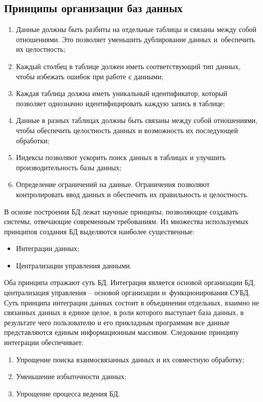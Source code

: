 \documentclass{ou}
\begin{document}
\subsection{Принципы организации баз данных}
\begin{enumerate}[leftmargin=0em, itemindent=3.75em, nosep, label=\arabic*)]
\item Данные должны быть разбиты на отдельные таблицы и связаны между собой отношениями. Это позволяет уменьшить дублирование данных и~обеспечить их целостность;
\item Каждый столбец в таблице должен иметь соответствующий тип данных, чтобы избежать ошибок при работе с данными;
\item Каждая таблица должна иметь уникальный идентификатор, который позволяет однозначно идентифицировать каждую запись в таблице\cite{Karpova2013};
\item Данные в разных таблицах должны быть связаны между собой отношениями, чтобы обеспечить целостность данных и возможность их последующей обработки;
\item Индексы позволяют ускорить поиск данных в таблицах и улучшить производительность базы данных;
\item Определение ограничений на данные. Ограничения позволяют контролировать ввод данных и обеспечить их правильность и целостность\cite{Sergeev2012}.
\end{enumerate}

В основе построения БД лежат научные принципы, позволяющие создавать системы, отвечающие современным требованиям. Из множества используемых принципов создания БД выделяются наиболее существенные:
\begin{itemize}[label=-, leftmargin=0em, itemindent=3.35em, nosep]
\item Интеграции данных;
\item Централизации управления данными.
\end{itemize}

Оба принципа отражают суть БД. Интеграция является основой организации БД, централизация управления -- основой организации и~функционирования СУБД. 
Суть принципа интеграции данных состоит в объединении отдельных, взаимно не связанных данных в единое целое, в роли которого выступает база данных, в результате чего пользователю и его прикладным программам все данные представляются единым информационным массивом. Следование принципу интеграции обеспечивает:
\begin{enumerate}[leftmargin=0em, itemindent=3.75em, nosep, label=\arabic*)]
\item Упрощение поиска взаимосвязанных данных и их совместную обработку;
\item Уменьшение избыточности данных;
\item Упрощение процесса ведения БД\cite{Elmudurov2023}.
\end{enumerate}
\end{document}
